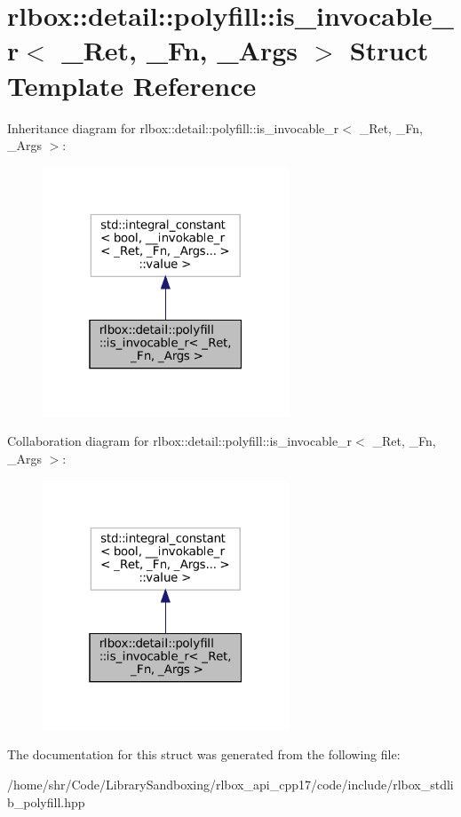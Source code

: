 \hypertarget{structrlbox_1_1detail_1_1polyfill_1_1is__invocable__r}{}\section{rlbox\+:\+:detail\+:\+:polyfill\+:\+:is\+\_\+invocable\+\_\+r$<$ \+\_\+\+Ret, \+\_\+\+Fn, \+\_\+\+Args $>$ Struct Template Reference}
\label{structrlbox_1_1detail_1_1polyfill_1_1is__invocable__r}


Inheritance diagram for rlbox\+:\+:detail\+:\+:polyfill\+:\+:is\+\_\+invocable\+\_\+r$<$ \+\_\+\+Ret, \+\_\+\+Fn, \+\_\+\+Args $>$\+:\nopagebreak
\begin{figure}[H]
\begin{center}
\leavevmode
\includegraphics[width=208pt]{structrlbox_1_1detail_1_1polyfill_1_1is__invocable__r__inherit__graph}
\end{center}
\end{figure}


Collaboration diagram for rlbox\+:\+:detail\+:\+:polyfill\+:\+:is\+\_\+invocable\+\_\+r$<$ \+\_\+\+Ret, \+\_\+\+Fn, \+\_\+\+Args $>$\+:\nopagebreak
\begin{figure}[H]
\begin{center}
\leavevmode
\includegraphics[width=208pt]{structrlbox_1_1detail_1_1polyfill_1_1is__invocable__r__coll__graph}
\end{center}
\end{figure}


The documentation for this struct was generated from the following file\+:\begin{DoxyCompactItemize}
\item 
/home/shr/\+Code/\+Library\+Sandboxing/rlbox\+\_\+api\+\_\+cpp17/code/include/rlbox\+\_\+stdlib\+\_\+polyfill.\+hpp\end{DoxyCompactItemize}
